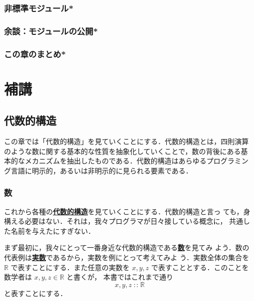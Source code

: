 \documentclass[a5paper,twoside,fleqn,draft]{jsbook}
\newenvironment{leader}{\begingroup\gt}{\endgroup}
\newcommand{\keyword}[1]{{\underline{\textbf{#1}}}}
\DeclareMathOperator{\mIn}{{:\!:}}
\newcommand{\mSpecialSet}[1]{\mathbb{#1}} %
\newcommand{\mRSet}{\mSpecialSet{R}}
\begin{document}
\section{非標準モジュール*}
\section{余談：モジュールの公開*}
\section{この章のまとめ*}

\part{補講}

\chapter{代数的構造}

\begin{leader}
この章では「代数的構造」を見ていくことにする．代数的構造とは，四則演算
のような数に関する基本的な性質を抽象化していくことで，数の背後にある基
本的なメカニズムを抽出したものである．代数的構造はあらゆるプログラミン
グ言語に明示的，あるいは非明示的に見られる要素である．
\end{leader}

\section{数}

これから各種の\keyword{代数的構造}を見ていくことにする．代数的構造と言っ
ても，身構える必要はない．それは，我々プログラマが日々接している概念に，
共通した名前を与えたにすぎない．

まず最初に，我々にとって一番身近な代数的構造である\keyword{数}を見てみ
よう．数の代表例は\keyword{実数}であるから，実数を例にとって考えてみよ
う．実数全体の集合を $\mRSet$ で表すことにする．また任意の実数を
$x,y,z$ で表すこととする．このことを数学者は $x,y,z\in\mRSet$ と書くが，
本書ではこれまで通り
\begin{equation}
x,y,z\mIn\mRSet
\end{equation}
と表すことにする．
\end{document}
